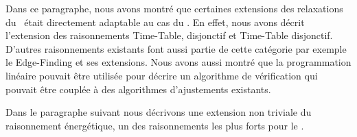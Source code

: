 Dans ce paragraphe, nous avons montré que certaines extensions des
relaxations du \CUSP~était directement adaptable au cas du \CECSP. En
effet, nous avons décrit l'extension des raisonnements Time-Table,
disjonctif et Time-Table disjonctif. D'autres raisonnements existants
font aussi partie de cette catégorie par exemple le Edge-Finding et
ses extensions. Nous avons aussi montré que la programmation linéaire
pouvait être utilisée pour décrire un algorithme de vérification qui
pouvait être couplée à des algorithmes d'ajustements existants.

Dans le paragraphe suivant nous décrivons une extension non triviale du
raisonnement énergétique, un des raisonnements les plus forts pour le \CUSP.